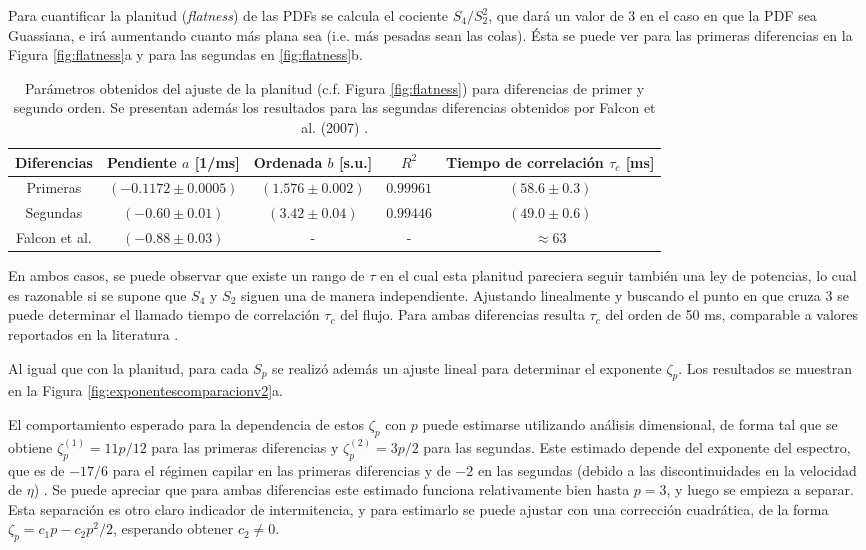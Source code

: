  


Para cuantificar la planitud (\textit{flatness}) de las PDFs se calcula el cociente $S_4/S_2^2$, que dará un valor de 3 en el caso en que la PDF sea Guassiana, e irá aumentando cuanto más plana sea (i.e. más pesadas sean las colas). Ésta se puede ver para las primeras diferencias en la Figura \ref{fig:flatness}a y para las segundas en \ref{fig:flatness}b. %

\begin{table} %
	\centering
	\begin{tabular}{ |c | c | c | c | c | }       
		\hline
		Diferencias & Pendiente $a$ [1/ms] & Ordenada $b$ [s.u.] & $R^2$ & Tiempo de correlación $\tau_c$ [ms] \\
		\hline
		Primeras & $(-0.1172\pm0.0005)$ & $(1.576\pm0.002)$ & $0.99961$ & $(58.6\pm0.3)$ \\
		Segundas & $(-0.60\pm0.01)$ & $(3.42\pm0.04)$ & $0.99446$  & $(49.0\pm0.6)$ \\  
		Falcon et al. & $(-0.88\pm0.03)$ & - & - & $\approx63$ \\ 
		\hline 
	\end{tabular} 
	\caption{Parámetros obtenidos del ajuste de la planitud (c.f. Figura \ref{fig:flatness}) para diferencias de primer y segundo orden. Se presentan además los resultados para las segundas diferencias obtenidos por Falcon  et al. (2007)  \cite{falconObservationIntermittencyWave2007}. } %
	\label{tab:flatness_fit}
\end{table}

En ambos casos, se puede observar que existe un rango de $\tau$ en el cual esta planitud pareciera seguir también una ley de potencias, lo cual es razonable si se supone que $S_4$ y $S_2$ siguen una de manera independiente. Ajustando linealmente y buscando el punto en que cruza 3 se puede determinar el llamado tiempo de correlación $\tau_c$ del flujo. Para ambas diferencias resulta $\tau_c$ del orden de 50 ms, comparable a valores reportados en la literatura \cite{falconObservationIntermittencyWave2007}.  



Al igual que con la planitud, para cada $S_p$ se realizó además un ajuste lineal para determinar el exponente $\zeta_p$. Los resultados se muestran en la Figura \ref{fig:exponentescomparacionv2}a. %



El comportamiento esperado para la dependencia de estos $\zeta_p$ con $p$ puede estimarse utilizando análisis dimensional, de forma tal que se obtiene $\zeta_p^{(1)}=11p/12$ para las primeras diferencias y $\zeta_p^{(2)}=3p/2$ para las segundas. Este estimado depende del exponente del espectro, que es de $-17/6$ para el régimen capilar en las primeras diferencias y de $-2$ en las segundas (debido a las discontinuidades en la velocidad de $\eta$) \cite{falconObservationIntermittencyWave2007}.  Se puede apreciar que para ambas diferencias este estimado funciona relativamente bien hasta $p=3$, y luego se empieza a separar. Esta separación es otro claro indicador de intermitencia, y para estimarlo se puede ajustar con una corrección cuadrática, de la forma $\zeta_p=c_1 p - c_2p^2/2$, esperando obtener $c_2\neq0$. 

